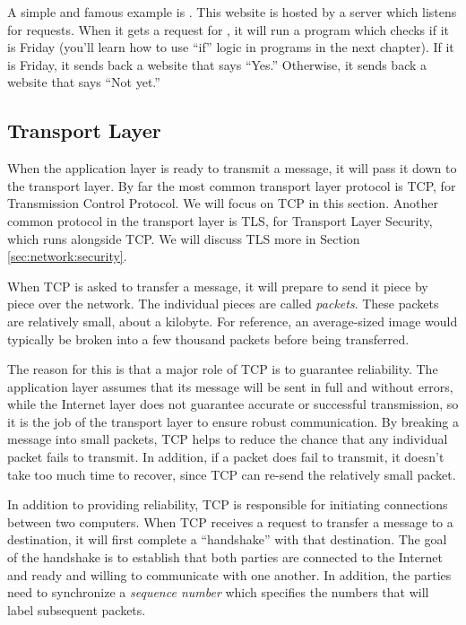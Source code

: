 A simple and famous example is . This website is hosted by a server which listens for requests. When it gets a request for , it will run a program which checks if it is Friday (you'll learn how to use ``if'' logic in programs in the next chapter). If it is Friday, it sends back a website that says ``Yes.'' Otherwise, it sends back a website that says ``Not yet.''

\subsection{Transport Layer}

When the application layer is ready to transmit a message, it will pass it down to the transport layer. By far the most common transport layer protocol is TCP, for Transmission Control Protocol. We will focus on TCP in this section. Another common protocol in the transport layer is TLS, for Transport Layer Security, which runs alongside TCP. We will discuss TLS more in Section \ref{sec:network:security}.

When TCP is asked to transfer a message, it will prepare to send it piece by piece over the network. The individual pieces are called \emph{packets}. These packets are relatively small, about a kilobyte. For reference, an average-sized image would typically be broken into a few thousand packets before being transferred. 

The reason for this is that a major role of TCP is to guarantee reliability. The application layer assumes that its message will be sent in full and without errors, while the Internet layer does not guarantee accurate or successful transmission, so it is the job of the transport layer to ensure robust communication. By breaking a message into small packets, TCP helps to reduce the chance that any individual packet fails to transmit. In addition, if a packet does fail to transmit, it doesn't take too much time to recover, since TCP can re-send the relatively small packet.

In addition to providing reliability, TCP is responsible for initiating connections between two computers. When TCP receives a request to transfer a message to a destination, it will first complete a ``handshake'' with that destination. The goal of the handshake is to establish that both parties are connected to the Internet and ready and willing to communicate with one another. In addition, the parties need to synchronize a \emph{sequence number} which specifies the numbers that will label subsequent packets.

